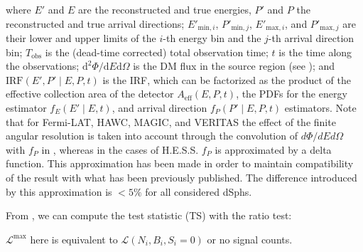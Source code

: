 where $ E' $ and $ E $ are the reconstructed and true energies, $ P' $ and $ P $ the reconstructed and true arrival directions; $ E'_{\text{min},i} $, $ P'_{\text{min},j} $, $ E'_{\text{max},i} $, and $ P'_{\text{max},j} $ are their lower and upper limits of the $ i $-th energy bin and the $ j $-th arrival direction bin; $ T_{\text{obs}} $ is the (dead-time corrected) total observation time; $ t $ is the time along the observations; $ \text{d}^{2}\Phi/\text{d}E\text{d}\Omega $ is the DM flux in the source region (see );
and $ \text{IRF} \left( E', P' \mid E, P, t \right) $ is the IRF, which can be factorized as the product of the effective collection area of the detector $ A_{\mathrm{eff}} (E, P, t) $, the PDFs for the energy estimator $ f_{E} (E' \mid E,t) $, and arrival direction $ f_{P} (P' \mid E,P,t) $ estimators.
Note that for Fermi-LAT, HAWC, MAGIC, and VERITAS the effect of the finite angular resolution is taken into account through the convolution of $d\Phi/dE d\Omega$ with $f_{P}$ in , whereas in the cases of H.E.S.S. $f_{P}$ is approximated by a delta function.
This approximation has been made in order to maintain compatibility of the result with what has been previously published.
The difference introduced by this approximation is $<5\%$ for all considered dSphs.

From , we can compute the test statistic (TS) with the ratio test:

\gdTS

$\mathcal{L}^{\textrm{max}}$ here is equivalent to $\mathcal{L}(N_i, B_i,S_i=0)$ or no signal counts.

